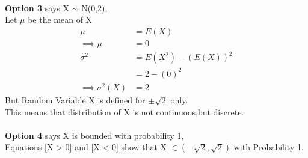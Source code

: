 \documentclass[journal,12pt,twocolumn]{IEEEtran}
\begin{document}
\centering {}
\vspace{0.8cm} \\
\textbf{Option 3} says X $\sim$ N(0,2),\\
Let $\mu$ be the mean of X
\begin{align*}
            \mu &= E(X) \\
    \tag{6} \label{mu}
   \implies \mu &= 0 \\
      \sigma^2 &= E(X^2) - (E(X))^{2} \\
                &= 2 - (0)^{2} \\
                \tag{7} \label{Var(X)}
\implies \sigma^2(X) &= 2
\end{align*}
But Random Variable X is defined for $\pm\sqrt{2}$ only.\\
This means that distribution of X is not continuous,but discrete.
\vspace{0.05cm}\\
\centering {}
\pagebreak  \\
\centering
\textbf{Option 4} says X is bounded with probability 1, \\
Equations \eqref{X > 0} and \eqref{X < 0} show that X $\in ({-\sqrt{2},\sqrt{2}})$ with Probability 1. 
\vspace{0.5cm} \\
\centering {}
\vspace{0.5cm}\\
\end{document}
